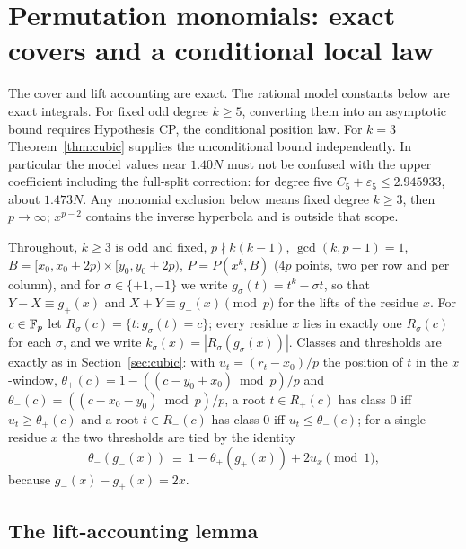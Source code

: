 \section{Permutation monomials: exact covers and a conditional local law}\label{sec:perm}

The cover and lift accounting are exact.  The rational model constants below are exact integrals.
For fixed odd degree $k\ge5$, converting them into an asymptotic bound requires Hypothesis CP, the conditional position law.
For $k=3$ Theorem~\ref{thm:cubic} supplies the unconditional bound independently.
In particular the model values near $1.40N$ must not be confused with the upper coefficient including the full-split correction:
for degree five $C_5+\varepsilon_5\le2.945933$, about $1.473N$.
Any monomial exclusion below means fixed degree $k\ge3$, then $p\to\infty$; $x^{p-2}$ contains the inverse hyperbola and is outside that scope.

Throughout, $k\ge3$ is odd and fixed, $p\nmid k(k-1)$, $\gcd(k,p-1)=1$, $B=[x_0,x_0+2p)\times[y_0,y_0+2p)$, $P=P(x^k,B)$ ($4p$ points, two per row and
per column), and for $\sigma\in\{+1,-1\}$ we write $g_\sigma(t)=t^k-\sigma t$, so that $Y-X\equiv g_+(x)$ and $X+Y\equiv g_-(x)\pmod p$ for the lifts of the
residue $x$.  For $c\in\mathbb{F}_p$ let $R_\sigma(c)=\{t: g_\sigma(t)=c\}$; every residue $x$ lies in exactly one $R_\sigma(c)$ for each $\sigma$, and we write
$k_\sigma(x)=|R_\sigma(g_\sigma(x))|$.  Classes and thresholds are exactly as in Section~\ref{sec:cubic}: with $u_t=(r_t-x_0)/p$ the position of $t$ in the
$x$-window, $\theta_+(c)=1-((c-y_0+x_0)\bmod p)/p$ and $\theta_-(c)=((c-x_0-y_0)\bmod p)/p$, a root $t\in R_+(c)$ has class $0$ iff $u_t\ge\theta_+(c)$ and a root
$t\in R_-(c)$ has class $0$ iff $u_t\le\theta_-(c)$; for a single residue $x$ the two thresholds are tied by the identity
\begin{equation}\label{eq:tie}
 \theta_-(g_-(x))\ \equiv\ 1-\theta_+(g_+(x))+2u_x\pmod 1 ,
\end{equation}
because $g_-(x)-g_+(x)=2x$.

\subsection*{The lift-accounting lemma}

